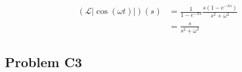 \documentclass[a4paper,10pt,reqno]{amsart}
\numberwithin{equation}{section}
\newcommand{\lap}{\mathscr{L}}
\begin{document}
\begin{align}
(\lap|{\cos(\omega t)|})(s) &= \frac{1}{1 - e^{-\pi s}}\frac{s(1 - e^{-\pi s})}{s^2 + \omega^2} \\
&= \frac{s}{s^2 + \omega^2}
\end{align}


\subsection{Problem C3}\label{sec:c3}








\end{document}
